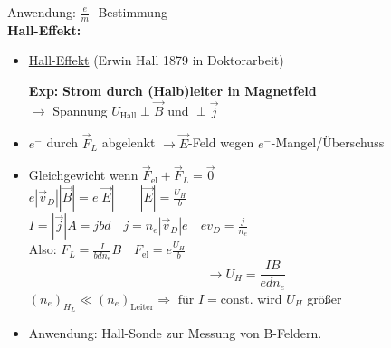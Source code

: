 \documentclass[titlepage,12pt,a4paper,ngerman]{report}
\newcommand{\tx}[1]{\textrm{#1}}
\begin{document}
Anwendung: $ \frac{e}{m} $- Bestimmung\\[10pt]
\textbf{Hall-Effekt:}
\begin{itemize}
	\item \underline{Hall-Effekt} (Erwin Hall 1879 in Doktorarbeit)
	\item[\textbf{Exp:}] \textbf{Strom durch (Halb)leiter in Magnetfeld}\\
	$ \rightarrow $ Spannung $ U_{\tx{Hall}} \perp \vec{B} $ und $ \perp \vec{j} $
	\item $ e^- $ durch $ \vec{F}_L $ abgelenkt $ \rightarrow \vec{E} $-Feld wegen $ e^- $-Mangel/Überschuss
	\item Gleichgewicht wenn $ \vec{F}_{\tx{el}} + \vec{F}_L = \vec{0} $\\
	$ e | \vec{v}_D | | \vec{B} | = e | \vec{E}| \qquad | \vec{E} | = \frac{U_H}{b} $\\
	$ I = |\vec{j}| A = j b d   \quad j = n_e |\vec{v}_D| e \quad e v_D = \frac{j}{n_e}$\\
	Also: $ F_L = \frac{I}{b d n_e} B \quad F_{\tx{el}} = e \frac{U_H}{b} $\\
	$$ \rightarrow \boxed{U_H = \frac{IB}{e d n_e}}$$ $(n_e)_{H_L} \ll (n_e)_{\tx{Leiter}} \Rightarrow \tx{ für } I = \tx{const.}  $ wird $ U_H $ größer
	\item Anwendung: Hall-Sonde zur Messung von B-Feldern.
\end{itemize}
\end{document}
